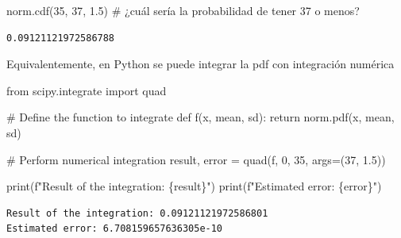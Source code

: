 \documentclass[
  letterpaper,
  DIV=11,
  numbers=noendperiod]{scrartcl}
\newenvironment{Shaded}{\begin{snugshade}}{\end{snugshade}}
\newcommand{\BuiltInTok}[1]{\textcolor[rgb]{0.00,0.23,0.31}{#1}}
\newcommand{\CommentTok}[1]{\textcolor[rgb]{0.37,0.37,0.37}{#1}}
\newcommand{\ControlFlowTok}[1]{\textcolor[rgb]{0.00,0.23,0.31}{#1}}
\newcommand{\DecValTok}[1]{\textcolor[rgb]{0.68,0.00,0.00}{#1}}
\newcommand{\FloatTok}[1]{\textcolor[rgb]{0.68,0.00,0.00}{#1}}
\newcommand{\ImportTok}[1]{\textcolor[rgb]{0.00,0.46,0.62}{#1}}
\newcommand{\KeywordTok}[1]{\textcolor[rgb]{0.00,0.23,0.31}{#1}}
\newcommand{\NormalTok}[1]{\textcolor[rgb]{0.00,0.23,0.31}{#1}}
\newcommand{\OperatorTok}[1]{\textcolor[rgb]{0.37,0.37,0.37}{#1}}
\newcommand{\SpecialCharTok}[1]{\textcolor[rgb]{0.37,0.37,0.37}{#1}}
\newcommand{\SpecialStringTok}[1]{\textcolor[rgb]{0.13,0.47,0.30}{#1}}
\begin{document}
\begin{Shaded}
\begin{Highlighting}[]
\NormalTok{norm.cdf(}\DecValTok{35}\NormalTok{, }\DecValTok{37}\NormalTok{, }\FloatTok{1.5}\NormalTok{)}
\CommentTok{\# ¿cuál sería la probabilidad de tener 37 o menos?}
\end{Highlighting}
\end{Shaded}

\begin{verbatim}
0.09121121972586788
\end{verbatim}

Equivalentemente, en Python se puede integrar la pdf con integración
numérica

\begin{Shaded}
\begin{Highlighting}[]
\ImportTok{from}\NormalTok{ scipy.integrate }\ImportTok{import}\NormalTok{ quad}

\CommentTok{\# Define the function to integrate}
\KeywordTok{def}\NormalTok{ f(x, mean, sd):}
    \ControlFlowTok{return}\NormalTok{ norm.pdf(x, mean, sd)}

\CommentTok{\# Perform numerical integration}
\NormalTok{result, error }\OperatorTok{=}\NormalTok{ quad(f, }\DecValTok{0}\NormalTok{, }\DecValTok{35}\NormalTok{, args}\OperatorTok{=}\NormalTok{(}\DecValTok{37}\NormalTok{, }\FloatTok{1.5}\NormalTok{))}

\BuiltInTok{print}\NormalTok{(}\SpecialStringTok{f"Result of the integration: }\SpecialCharTok{\{}\NormalTok{result}\SpecialCharTok{\}}\SpecialStringTok{"}\NormalTok{)}
\BuiltInTok{print}\NormalTok{(}\SpecialStringTok{f"Estimated error: }\SpecialCharTok{\{}\NormalTok{error}\SpecialCharTok{\}}\SpecialStringTok{"}\NormalTok{)}
\end{Highlighting}
\end{Shaded}

\begin{verbatim}
Result of the integration: 0.09121121972586801
Estimated error: 6.708159657636305e-10
\end{verbatim}
\end{document}
